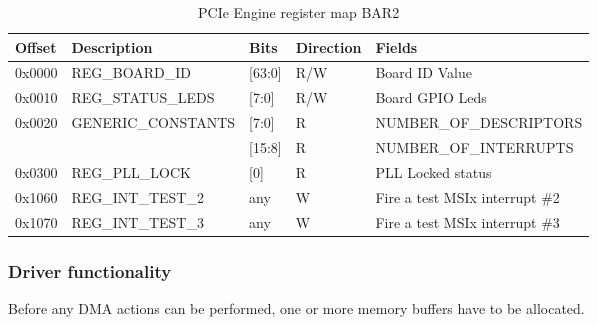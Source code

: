 \begin{table}[H]
	\centering
	\begin{tabularx}{\textwidth}{|l|X|l|l|l|}
	\hline
	\textbf{Offset} & \textbf{Description} &\textbf{Bits}&\textbf{Direction}& \textbf{Fields}\\
	\hline
	0x0000  & REG\_BOARD\_ID & [63:0] & R/W & Board ID Value\\
	\hline
	0x0010  & REG\_STATUS\_LEDS & [7:0] & R/W & Board GPIO Leds\\
	\hline
	0x0020  & GENERIC\_CONSTANTS& [7:0] & R & NUMBER\_OF\_DESCRIPTORS\\
	        & &[15:8] & R & NUMBER\_OF\_INTERRUPTS \\
	\hline
	0x0300  & REG\_PLL\_LOCK & [0] & R & PLL Locked status\\
	\hline
	0x1060  & REG\_INT\_TEST\_2 & any & W & Fire a test MSIx interrupt \#2 \\
	\hline
	0x1070  & REG\_INT\_TEST\_3 & any & W & Fire a test MSIx interrupt \#3 \\
	\hline

	\end{tabularx}
	\caption{PCIe Engine register map BAR2}\label{tab:dma_register_map_bar2}
\end{table}
\newpage
\subsubsection{Driver functionality}
Before any DMA actions can be performed, one or more memory buffers have to be allocated. 

